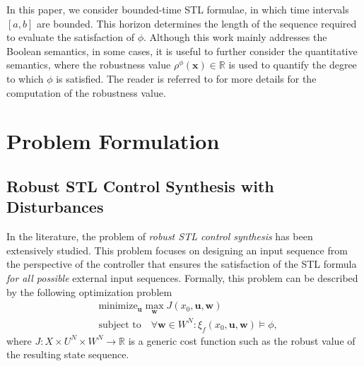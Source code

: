 \documentclass[letterpaper, 10 pt, conference]{ieeeconf}
\begin{document}

In this paper, we consider bounded-time STL formulae, in which time intervals $[a,b]$ are bounded. This horizon determines the length of the sequence required to evaluate the satisfaction of $\phi$.
Although this work mainly addresses the Boolean semantics, in some cases, it is useful to further consider the quantitative semantics, where the robustness value $\rho^\phi (\mathbf{x}) \in \mathbb{R}$ is used to quantify the degree to which $\phi$ is satisfied. 
The reader is referred to \cite{donze2010robust} for more details for the computation of the robustness value. 



\section{Problem Formulation}\label{sec-pro}

\subsection{Robust STL Control Synthesis with Disturbances}
%
In the literature, the problem of \emph{robust STL control synthesis} has been extensively studied. This problem focuses on designing an input sequence from the perspective of the controller that ensures the satisfaction of the STL formula \emph{for all possible} external input sequences.
Formally, this problem can be described by the following optimization problem
\begin{align}
    & \text{minimize}_{\mathbf{u}}\max_{\mathbf{w}} J(x_0, \mathbf{u},\mathbf{w}) \nonumber \\
    &\text{subject to} \quad  \forall \mathbf{w}\in W^N: 
    \xi_f(x_0,\mathbf{u},\mathbf{w})\models\phi, \nonumber
\end{align}
where  $J: X\times U^N \times W^N \to \mathbb{R}$ is a generic cost function such as the robust value of the resulting state sequence.
\end{document}
